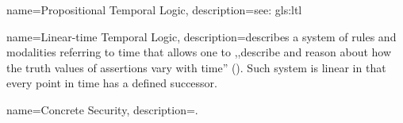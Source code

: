 {
    name={Propositional Temporal Logic},
    description={see: \gls{gls:ltl}}
}

{
    name={Linear-time Temporal Logic},
    description={describes a system of rules and modalities referring to time that allows one to ,,describe and reason about how the truth values of assertions vary
with time'' (\cite{emerson1990temporal}). Such system is linear in that every point in time has a defined successor.}
}

{
    name={Concrete Security},
    description={.}
}
